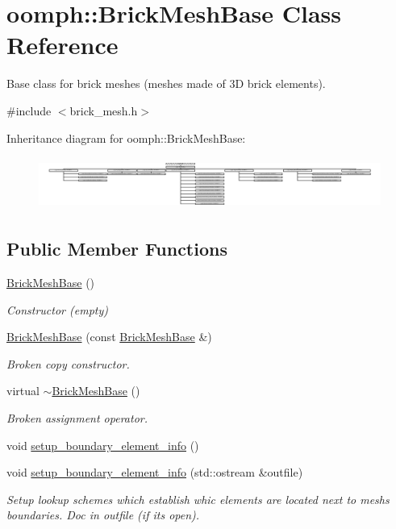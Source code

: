 \hypertarget{classoomph_1_1BrickMeshBase}{}\section{oomph\+:\+:Brick\+Mesh\+Base Class Reference}
\label{classoomph_1_1BrickMeshBase}


Base class for brick meshes (meshes made of 3D brick elements).  




{\ttfamily \#include $<$brick\+\_\+mesh.\+h$>$}

Inheritance diagram for oomph\+:\+:Brick\+Mesh\+Base\+:\begin{figure}[H]
\begin{center}
\leavevmode
\includegraphics[height=1.723485cm]{classoomph_1_1BrickMeshBase}
\end{center}
\end{figure}
\subsection*{Public Member Functions}
\begin{DoxyCompactItemize}
\item 
\hyperlink{classoomph_1_1BrickMeshBase_aab28517a83f91d118db9ce6b80a0d0a2}{Brick\+Mesh\+Base} ()
\begin{DoxyCompactList}\small\item\em Constructor (empty) \end{DoxyCompactList}\item 
\hyperlink{classoomph_1_1BrickMeshBase_a451d5198262174d67dc442a9ef72e9c3}{Brick\+Mesh\+Base} (const \hyperlink{classoomph_1_1BrickMeshBase}{Brick\+Mesh\+Base} \&)
\begin{DoxyCompactList}\small\item\em Broken copy constructor. \end{DoxyCompactList}\item 
virtual \hyperlink{classoomph_1_1BrickMeshBase_adc436f1ef22908929e148f420f4e11b9}{$\sim$\+Brick\+Mesh\+Base} ()
\begin{DoxyCompactList}\small\item\em Broken assignment operator. \end{DoxyCompactList}\item 
void \hyperlink{classoomph_1_1BrickMeshBase_aa2d28d573a5dadd0ddef912e2a2c6828}{setup\+\_\+boundary\+\_\+element\+\_\+info} ()
\item 
void \hyperlink{classoomph_1_1BrickMeshBase_a26aa6ff19735538e598bee956ad3d957}{setup\+\_\+boundary\+\_\+element\+\_\+info} (std\+::ostream \&outfile)
\begin{DoxyCompactList}\small\item\em Setup lookup schemes which establish whic elements are located next to mesh\textquotesingle{}s boundaries. Doc in outfile (if it\textquotesingle{}s open). \end{DoxyCompactList}\end{DoxyCompactItemize}
